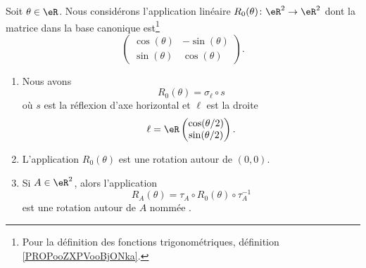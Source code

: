 \begin{lemmaDef}        \label{DEFooADTDooKIZbrw}
	Soit \( \theta\in \eR\). Nous considérons l'application linéaire \( R_0(\theta)\colon \eR^2\to \eR^2\) dont la matrice dans la base canonique est\footnote{Pour la définition des fonctions trigonométriques, définition \ref{PROPooZXPVooBjONka}.}
	\begin{equation}
		\begin{pmatrix}
			\cos(\theta) & -\sin(\theta) \\
			\sin(\theta) & \cos(\theta)
		\end{pmatrix}.
	\end{equation}
	\begin{enumerate}
		\item       \label{ITEMooIEKJooZfsAui}
		      Nous avons
		      \begin{equation}        \label{EQooEVCTooBpTDDq}
			      R_0(\theta)=\sigma_{\ell}\circ s
		      \end{equation}
		      où \( s\) est la réflexion d'axe horizontal et \( \ell\) est la droite
		      \begin{equation}
			      \ell=\eR\begin{pmatrix}
				      \cos(\theta/2) \\
				      \sin(\theta/2)
			      \end{pmatrix}.
		      \end{equation}
		\item       \label{ITEMooBEYOooMHRRYk}
		      L'application \( R_0(\theta)\) est une rotation autour de \( (0,0)\).
		\item     \label{ITEMooEQPAooQcsYfj}
		      Si \( A\in \eR^2\), alors l'application
		      \begin{equation}      \label{EQooKMJQooWGvWHe}
			      R_A(\theta)=\tau_A\circ R_0(\theta)\circ \tau_A^{-1}
		      \end{equation}
		      est une rotation autour de \( A\) nommée .
	\end{enumerate}
\end{lemmaDef}

